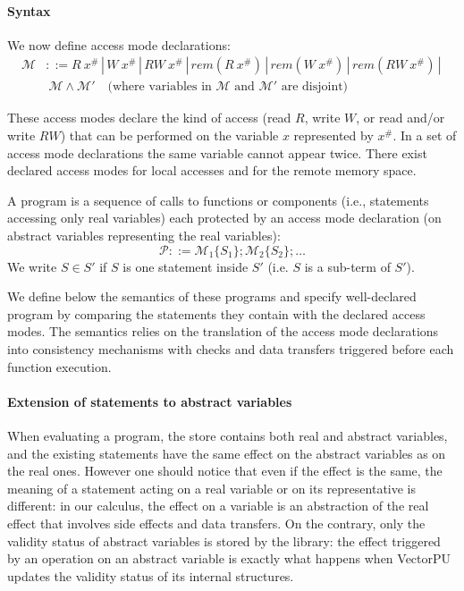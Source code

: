 \documentclass[preprint,12pt]{elsarticle}
\newcommand{\symb}[1]{\textit{#1}}
\newcommand{\rem}[1]{\symb{rem}(#1)}
\newcommand{\abs}[1]{#1^\#}
\newcommand{\AM}{\mathcal{M}}
\newcommand{\Prog}{\mathcal{P}}
\begin{document}
\paragraph{Syntax}
We now define access mode declarations:\\[-3.3ex]
\begin{align*}
\AM&::=R\ \abs x \,|\, W\ \abs x \,|\, RW\ \abs x \,|\, 
\rem{R\ \abs x} \,|\,\rem{W\ \abs x} \,|\,\rem{RW\ \abs x} \,|\, \\
&~ \AM \land \AM' \quad \text{(where variables in $\AM$ and $\AM'$ are disjoint)}
\end{align*}

These access modes declare the kind of access (read $R$, write $W$, or read and/or write 
$RW$) that 
can be performed on the variable $x$ represented by $\abs x$. In a set 
of access mode declarations the same variable cannot appear twice. There exist declared 
access modes for  local accesses and for  the 
remote memory space.

A program is a sequence of calls to functions or components (i.e., statements accessing 
only real variables) 
each protected by an access 
mode declaration (on abstract variables representing the real variables):
\[\Prog::=\AM_1\{S_1\};\AM_2\{S_2\};\ldots\]
We write  $S\in S'$ if $S$ is one statement inside $S'$ (i.e. $S$ is a sub-term of 
$S'$).

We  define below the semantics of these programs  and specify well-declared program by 
comparing the statements they contain with 
the declared access modes. The semantics relies on the translation of 
the access mode declarations into consistency mechanisms 
with checks and data transfers 
triggered 
before each function 
execution.


\paragraph{Extension of statements to abstract variables}
When evaluating a program, the store contains both real and abstract variables, and the 
existing 
statements have the same effect on the abstract variables as on the real ones. However 
one should notice that 
even if the effect is the same, the meaning of a statement acting on a real variable 
or on its representative is different: in our calculus, the effect on a variable is an 
abstraction of the real effect that involves side effects and data transfers. On the 
contrary, only the validity status of abstract variables is stored by the library: the 
effect triggered by an operation on an abstract variable is exactly what happens when 
VectorPU updates the validity status of its internal structures.
\end{document}
